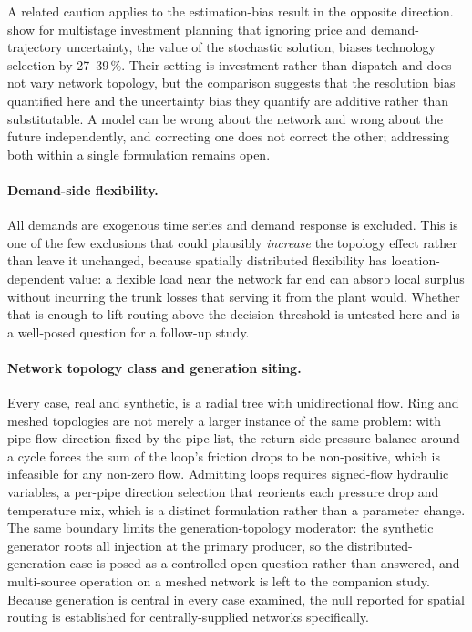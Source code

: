 A related caution applies to the estimation-bias result in the opposite direction.
\citet{Koek2026} show for multistage investment planning that ignoring price and
demand-trajectory uncertainty, the value of the stochastic solution, biases technology
selection by 27--39\,\%. Their setting is investment rather than dispatch and does not
vary network topology, but the comparison suggests that the resolution bias quantified
here and the uncertainty bias they quantify are additive rather than substitutable. A
model can be wrong about the network and wrong about the future independently, and
correcting one does not correct the other; addressing both within a single formulation
remains open.

\paragraph{Demand-side flexibility.}
All demands are exogenous time series and demand response is excluded. This is one of the
few exclusions that could plausibly \emph{increase} the topology effect rather than leave
it unchanged, because spatially distributed flexibility has location-dependent value: a
flexible load near the network far end can absorb local surplus without incurring the
trunk losses that serving it from the plant would. Whether that is enough to lift routing
above the decision threshold is untested here and is a well-posed question for a follow-up
study.

\paragraph{Network topology class and generation siting.}
Every case, real and synthetic, is a radial tree with unidirectional flow. Ring and meshed
topologies are not merely a larger instance of the same problem: with pipe-flow direction
fixed by the pipe list, the return-side pressure balance around a cycle forces the sum of
the loop's friction drops to be non-positive, which is infeasible for any non-zero flow.
Admitting loops requires signed-flow hydraulic variables, a per-pipe direction selection
that reorients each pressure drop and temperature mix, which is a distinct formulation
rather than a parameter change. The same boundary limits the generation-topology
moderator: the synthetic generator roots all injection at the primary producer, so the
distributed-generation case is posed as a controlled open question rather than answered,
and multi-source operation on a meshed network is left to the companion study. Because
generation is central in every case examined, the null reported for spatial routing is
established for centrally-supplied networks specifically.

